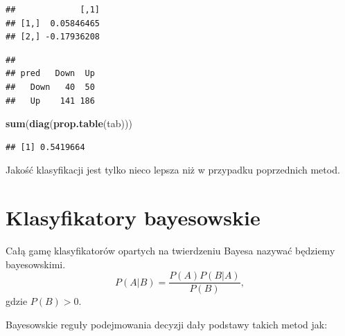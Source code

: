 \documentclass[
]{book}
\newenvironment{Shaded}{\begin{snugshade}}{\end{snugshade}}
\newcommand{\DataTypeTok}[1]{\textcolor[rgb]{0.13,0.29,0.53}{#1}}
\newcommand{\KeywordTok}[1]{\textcolor[rgb]{0.13,0.29,0.53}{\textbf{#1}}}
\newcommand{\NormalTok}[1]{#1}
\newcommand{\OperatorTok}[1]{\textcolor[rgb]{0.81,0.36,0.00}{\textbf{#1}}}
\newcommand{\StringTok}[1]{\textcolor[rgb]{0.31,0.60,0.02}{#1}}
\theoremstyle{plain}
\theoremstyle{definition}
\theoremstyle{definition}
\theoremstyle{definition}
\theoremstyle{definition}
\theoremstyle{remark}
\begin{document}
\begin{Shaded}
\end{Shaded}

\begin{verbatim}
##             [,1]
## [1,]  0.05846465
## [2,] -0.17936208
\end{verbatim}

\begin{Shaded}
\end{Shaded}

\begin{verbatim}
##       
## pred   Down  Up
##   Down   40  50
##   Up    141 186
\end{verbatim}

\begin{Shaded}
\begin{Highlighting}[]
\KeywordTok{sum}\NormalTok{(}\KeywordTok{diag}\NormalTok{(}\KeywordTok{prop.table}\NormalTok{(tab)))}
\end{Highlighting}
\end{Shaded}

\begin{verbatim}
## [1] 0.5419664
\end{verbatim}

Jakość klasyfikacji jest tylko nieco lepsza niż w przypadku poprzednich metod.

\hypertarget{bayes}{%
\chapter{Klasyfikatory bayesowskie}\label{bayes}}

Całą gamę klasyfikatorów opartych na twierdzeniu Bayesa nazywać będziemy bayesowskimi.
\begin{equation}\label{bayes}
        P(A|B)=\frac{P(A)P(B|A)}{P(B)},
\end{equation}
gdzie \(P(B)>0\).

Bayesowskie reguły podejmowania decyzji dały podstawy takich metod jak:
\end{document}

